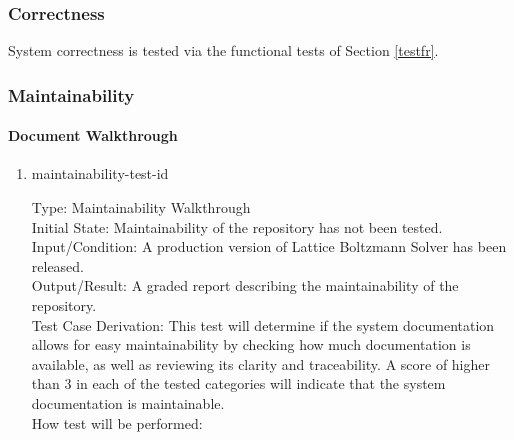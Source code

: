\documentclass[12pt, titlepage]{article}
\newcommand{\famname}{Lattice Boltzmann Solver}
\newcounter{testcounter} %
\begin{document}
\subsubsection{Correctness} \label{CorrectnessTest}

System correctness is tested via the functional tests of Section \ref{testfr}.

\subsubsection{Maintainability}
		
\paragraph{Document Walkthrough}

\begin{enumerate}

\item{maintainability-test-id\thetestcounter \\}

Type: Maintainability Walkthrough\\
					
Initial State: Maintainability of the repository has not been tested.\\
					
Input/Condition: A production version of {\famname} has been released.\\
					
Output/Result: A graded report describing the maintainability of the repository.\\

Test Case Derivation: This test will determine if the system documentation
allows for easy maintainability by checking how much documentation is available,
as well as reviewing its clarity and traceability. A score of higher than 3 in
each of the tested categories will indicate that the system documentation is
maintainable.\\
					
How test will be performed: 


\end{enumerate}
\end{document}

